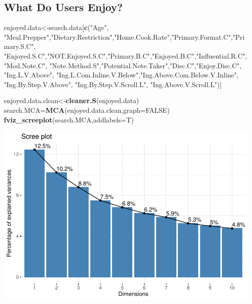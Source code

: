 \documentclass[
]{article}
\newenvironment{Shaded}{\begin{snugshade}}{\end{snugshade}}
\newcommand{\DataTypeTok}[1]{\textcolor[rgb]{0.13,0.29,0.53}{#1}}
\newcommand{\KeywordTok}[1]{\textcolor[rgb]{0.13,0.29,0.53}{\textbf{#1}}}
\newcommand{\NormalTok}[1]{#1}
\newcommand{\OtherTok}[1]{\textcolor[rgb]{0.56,0.35,0.01}{#1}}
\newcommand{\StringTok}[1]{\textcolor[rgb]{0.31,0.60,0.02}{#1}}
\begin{document}
\hypertarget{what-do-users-enjoy}{%
\subsection{What Do Users Enjoy?}\label{what-do-users-enjoy}}

\begin{Shaded}
\begin{Highlighting}[]
\NormalTok{enjoyed.data<-search.data[}\KeywordTok{c}\NormalTok{(}\StringTok{"Age"}\NormalTok{, }\StringTok{"Meal.Prepper"}\NormalTok{,}\StringTok{"Dietary.Restriction"}\NormalTok{,}\StringTok{"Home.Cook.Rate"}\NormalTok{,}\StringTok{"Primary.Format.C"}\NormalTok{,}\StringTok{"Primary.S.C"}\NormalTok{,}
            \StringTok{"Enjoyed.S.C"}\NormalTok{,}\StringTok{"NOT.Enjoyed.S.C"}\NormalTok{,}\StringTok{"Primary.B.C"}\NormalTok{,}\StringTok{"Enjoyed.B.C"}\NormalTok{,}\StringTok{"Influential.R.C"}\NormalTok{, }
            \StringTok{"Mod.Note.C"}\NormalTok{, }
            \StringTok{"Note.Method.S"}\NormalTok{,}\StringTok{"Potential.Note.Taker"}\NormalTok{,}\StringTok{"Disc.C"}\NormalTok{,}\StringTok{"Enjoy.Disc.C"}\NormalTok{, }\StringTok{"Ing.L.V.Above"}\NormalTok{,}
            \StringTok{"Ing.L.Com.Inline.V.Below"}\NormalTok{,}\StringTok{"Ing.Above.Com.Below.V.Inline"}\NormalTok{,  }\StringTok{"Ing.By.Step.V.Above"}\NormalTok{,  }\StringTok{"Ing.By.Step.V.Scroll.L"}\NormalTok{,}
            \StringTok{"Ing.Above.V.Scroll.L"}\NormalTok{)]}

\NormalTok{enjoyed.data.clean<-}\KeywordTok{cleaner.S}\NormalTok{(enjoyed.data)}
\NormalTok{search.MCA=}\KeywordTok{MCA}\NormalTok{(enjoyed.data.clean,}\DataTypeTok{graph=}\OtherTok{FALSE}\NormalTok{)}
\KeywordTok{fviz_screeplot}\NormalTok{(search.MCA,}\DataTypeTok{addlabels=}\NormalTok{T)}
\end{Highlighting}
\end{Shaded}

\includegraphics{Average-User-MCA_files/figure-latex/mca enjoyed all-1.pdf}
\end{document}

